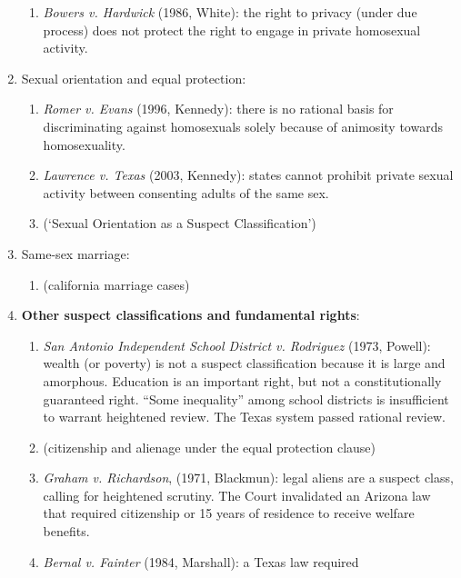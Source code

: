 \begin{enumerate}
    \begin{enumerate}
        \item \emph{Bowers v.  Hardwick} (1986, White): the right to privacy 
        (under due process) does not protect the right to engage in private 
        homosexual activity. %
    \end{enumerate}
    \item Sexual orientation and equal protection:
    \begin{enumerate}
        \item \emph{Romer v. Evans} (1996, Kennedy): there is no rational 
        basis for discriminating against homosexuals solely because of 
        animosity towards homosexuality. %
        \item \emph{Lawrence v. Texas} (2003, Kennedy): states cannot prohibit 
        private sexual activity between consenting adults of the same sex. 
        \item (`Sexual Orientation as a Suspect Classification') %
    \end{enumerate}
    \item Same-sex marriage:
    \begin{enumerate}
        \item (california marriage cases) %
    \end{enumerate}
    \item \textbf{Other suspect classifications and fundamental rights}:
    \begin{enumerate}
        \item \emph{San Antonio Independent School District v. Rodriguez} 
        (1973, Powell): wealth (or poverty) is not a suspect classification 
        because it is large and amorphous. Education is an important right, 
        but not a constitutionally guaranteed right. ``Some inequality'' among 
        school districts is insufficient to warrant heightened review. The 
        Texas system passed rational review. %
        \item (citizenship and alienage under the equal protection clause)
        \item \emph{Graham v. Richardson}, (1971, Blackmun): legal aliens are 
        a suspect class, calling for heightened scrutiny. The Court 
        invalidated an Arizona law that required citizenship or 15 years of 
        residence to receive welfare benefits.
        \item \emph{Bernal v. Fainter} (1984, Marshall): a Texas law required 

\end{enumerate}
\end{enumerate}
